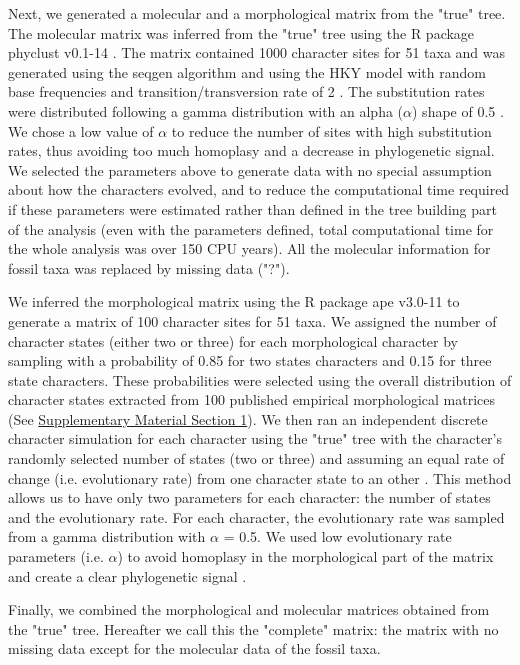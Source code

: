 \documentclass[12pt,letterpaper]{article}
\begin{document}
Next, we generated a molecular and a morphological matrix from the "true" tree. The molecular matrix was inferred from the "true" tree using the R package phyclust v0.1-14 \citep{chen2011}. The matrix contained 1000 character sites for 51 taxa and was generated using the seqgen algorithm \citep{ranbaut1997seqgen} and using the HKY model \citep{HKY85} with random base frequencies and transition/transversion rate of 2 \citep{douadycomparison2003}. The substitution rates were distributed following a gamma distribution with an alpha ($\alpha$) shape of 0.5 \citep{yangamong-site1996}. We chose a low value of $\alpha$ to reduce the number of sites with high substitution rates, thus avoiding too much homoplasy and a decrease in phylogenetic signal. We selected the parameters above to generate data with no special assumption about how the characters evolved, and to reduce the computational time required if these parameters were estimated rather than defined in the tree building part of the analysis (even with the parameters defined, total computational time for the whole analysis was over 150 CPU years). All the molecular information for fossil taxa was replaced by missing data ("?").

We inferred the morphological matrix using the R package ape v3.0-11 \citep{paradisape:2004} to generate a matrix of 100 character sites for 51 taxa. We assigned the number of character states (either two or three) for each morphological character by sampling with a probability of 0.85 for two states characters and 0.15 for three state characters. These probabilities were selected using the overall distribution of character states extracted from 100 published empirical morphological matrices (See \hyperref[SupplementaryMaterial]{Supplementary Material Section 1}). We then ran an independent discrete character simulation for each character using the "true" tree with the character's randomly selected number of states (two or three) and assuming an equal rate of change (i.e. evolutionary rate) from one character state to an other \citep{Pagel22011994}. This method allows us to have only two parameters for each character: the number of states and the evolutionary rate. For each character, the evolutionary rate was sampled from a gamma distribution with $\alpha$ = 0.5. We used low evolutionary rate parameters (i.e. $\alpha$) to avoid homoplasy in the morphological part of the matrix and create a clear phylogenetic signal \citep{wagner2000,davalosintegrating2014}.

Finally, we combined the morphological and molecular matrices obtained from the "true" tree. Hereafter we call this the "complete" matrix: the matrix with no missing data except for the molecular data of the fossil taxa.
\end{document}
